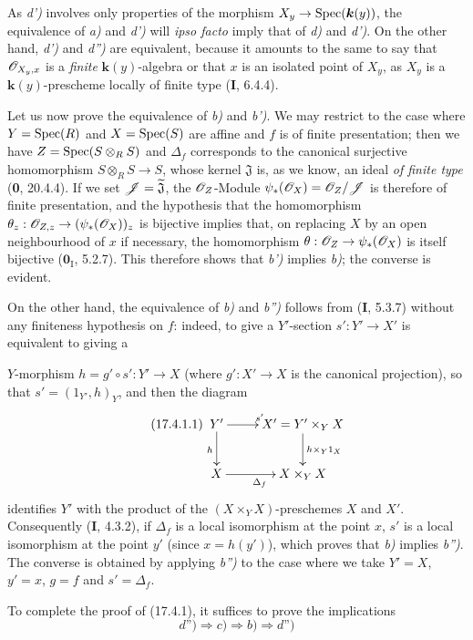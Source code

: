 As \emph{d')} involves only properties of the morphism $X_y\to\operatorname{Spec}(\boldsymbol{k}(y))$, the equivalence of \emph{a)} and \emph{d')} will \emph{ipso facto} imply that of \emph{d)} and \emph{d')}. On the other hand, \emph{d')} and \emph{d'')} are equivalent, because it amounts to the same to say that $\mathscr{O}_{X_y,x}$ is a \emph{finite} $\boldsymbol{k}(y)$-algebra or that $x$ is an isolated point of $X_y$, as $X_y$ is a $\boldsymbol{k}(y)$-prescheme locally of finite type (\textbf{I}, 6.4.4).

Let us now prove the equivalence of \emph{b)} and \emph{b')}. We may restrict to the case where $Y=\operatorname{Spec}(R)$ and $X=\operatorname{Spec}(S)$ are affine and $f$ is of finite presentation; then we have $Z=\operatorname{Spec}(S\otimes_R S)$ and $\Delta_f$ corresponds to the canonical surjective homomorphism $S\otimes_R S\to S$, whose kernel $\mathfrak{J}$ is, as we know, an ideal \emph{of finite type} (\textbf{0}, 20.4.4). If we set $\mathscr{J}=\widetilde{\mathfrak{J}}$, the $\mathscr{O}_Z$-Module $\psi_*(\mathscr{O}_X)=\mathscr{O}_Z/\mathscr{J}$ is therefore of finite presentation, and the hypothesis that the homomorphism $\theta_z: \mathscr{O}_{Z,z}\to(\psi_*(\mathscr{O}_X))_z$ is bijective implies that, on replacing $X$ by an open neighbourhood of $x$ if necessary, the homomorphism $\theta:\mathscr{O}_Z\to\psi_*(\mathscr{O}_X)$ is itself bijective ($\mathbf{0}_{\mathrm I}$, 5.2.7). This therefore shows that \emph{b')} implies \emph{b)}; the converse is evident.

On the other hand, the equivalence of \emph{b)} and \emph{b'')} follows from (\textbf{I}, 5.3.7) without any finiteness hypothesis on $f$: indeed, to give a $Y'$-section $s':Y'\to X'$ is equivalent to giving a

$Y$-morphism $h=g'\circ s':Y'\to X$ (where $g':X'\to X$ is the canonical projection), so that $s'=(1_{Y'},h)_Y$, and then the diagram
\[
\tag{17.4.1.1}
\label{IV.17.4.1.1}
\xymatrix{
Y' \ar[r]^{s'} \ar[d]_h & X'=Y'\times_Y X \ar[d]^{h\times_Y 1_X}\\
X \ar[r]_{\Delta_f} & X\times_Y X
}
\]
identifies $Y'$ with the product of the $(X\times_Y X)$-preschemes $X$ and $X'$. Consequently (\textbf{I}, 4.3.2), if $\Delta_f$ is a local isomorphism at the point $x$, $s'$ is a local isomorphism at the point $y'$ (since $x=h(y')$), which proves that \emph{b)} implies \emph{b'')}.  The converse is obtained by applying \emph{b'')} to the case where we take $Y'=X$, $y'=x$, $g=f$ and $s'=\Delta_f$.

To complete the proof of (17.4.1), it suffices to prove the implications
\[
\textit{d'')}\Rightarrow\textit{c)}\Rightarrow\textit{b)}\Rightarrow\textit{d'')}
\]

